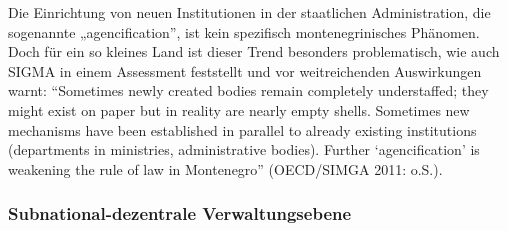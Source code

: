 Die Einrichtung von neuen Institutionen in der staatlichen Administration, die sogenannte „agencification”, ist kein spezifisch montenegrinisches Phänomen. Doch für ein so kleines Land ist dieser Trend besonders problematisch, wie auch SIGMA in einem Assessment feststellt und vor weitreichenden Auswirkungen warnt: “Sometimes newly created bodies remain completely understaffed; they might exist on paper but in reality are nearly empty shells. Sometimes new mechanisms have been established in parallel to already existing institutions (departments in ministries, administrative bodies). Further ‘agencification’ is weakening the rule of law in Montenegro” (OECD/SIMGA 2011: o.S.).

\subsubsection{Subnational-dezentrale Verwaltungsebene}

